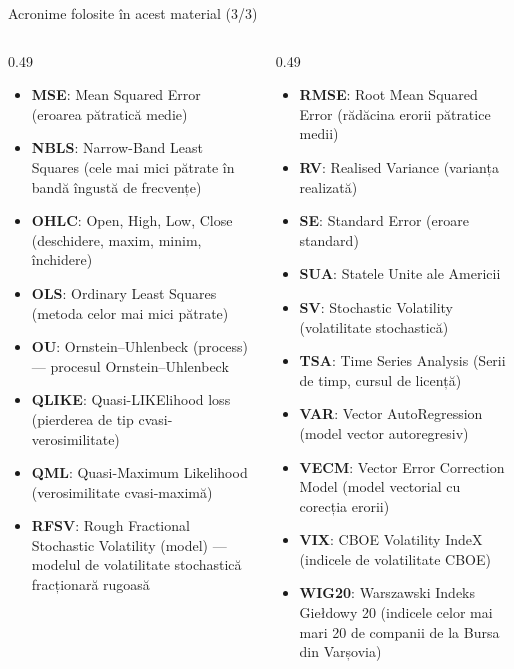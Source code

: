 \begin{frame}{Acronime folosite în acest material (3/3)}
\begin{columns}[T]
\begin{column}{0.49\textwidth}
\begin{itemize}\setlength{\itemsep}{0pt}
    \item \textbf{MSE}: Mean Squared Error (eroarea pătratică medie)
    \item \textbf{NBLS}: Narrow-Band Least Squares (cele mai mici pătrate în bandă îngustă de frecvențe)
    \item \textbf{OHLC}: Open, High, Low, Close (deschidere, maxim, minim, închidere)
    \item \textbf{OLS}: Ordinary Least Squares (metoda celor mai mici pătrate)
    \item \textbf{OU}: Ornstein–Uhlenbeck (process) — procesul Ornstein–Uhlenbeck
    \item \textbf{QLIKE}: Quasi-LIKElihood loss (pierderea de tip cvasi-verosimilitate)
    \item \textbf{QML}: Quasi-Maximum Likelihood (verosimilitate cvasi-maximă)
    \item \textbf{RFSV}: Rough Fractional Stochastic Volatility (model) — modelul de volatilitate stochastică fracționară rugoasă
\end{itemize}
\end{column}
\begin{column}{0.49\textwidth}
\begin{itemize}\setlength{\itemsep}{0pt}
    \item \textbf{RMSE}: Root Mean Squared Error (rădăcina erorii pătratice medii)
    \item \textbf{RV}: Realised Variance (varianța realizată)
    \item \textbf{SE}: Standard Error (eroare standard)
    \item \textbf{SUA}: Statele Unite ale Americii
    \item \textbf{SV}: Stochastic Volatility (volatilitate stochastică)
    \item \textbf{TSA}: Time Series Analysis (Serii de timp, cursul de licență)
    \item \textbf{VAR}: Vector AutoRegression (model vector autoregresiv)
    \item \textbf{VECM}: Vector Error Correction Model (model vectorial cu corecția erorii)
    \item \textbf{VIX}: CBOE Volatility IndeX (indicele de volatilitate CBOE)
    \item \textbf{WIG20}: Warszawski Indeks Giełdowy 20 (indicele celor mai mari 20 de companii de la Bursa din Varșovia)
\end{itemize}
\end{column}
\end{columns}
\end{frame}

